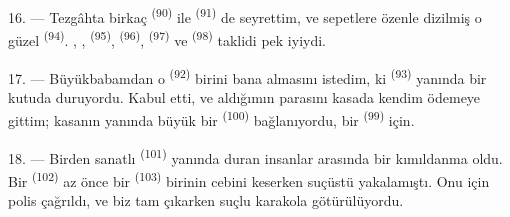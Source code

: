 16. --- Tezgâhta birkaç  \textsuperscript{(90)} ile
 \textsuperscript{(91)} de seyrettim, ve sepetlere
özenle dizilmiş o güzel  \textsuperscript{(94)}.
, , 
\textsuperscript{(95)},  \textsuperscript{(96)},
 \textsuperscript{(97)} ve 
\textsuperscript{(98)} taklidi pek iyiydi.

\VUsaut{4.4mm}
\VUsaut{2.8mm}

17. --- Büyükbabamdan o  \textsuperscript{(92)}
birini bana almasını istedim, ki 
\textsuperscript{(93)} yanında bir kutuda duruyordu. Kabul etti, ve aldığımın parasını kasada kendim ödemeye
gittim; kasanın yanında büyük bir  \textsuperscript{(100)}
bağlanıyordu, bir  \textsuperscript{(99)} için.

18. --- Birden sanatlı  \textsuperscript{(101)}
yanında duran insanlar arasında bir kımıldanma oldu. Bir 
\textsuperscript{(102)} az önce bir 
\textsuperscript{(103)} birinin cebini keserken suçüstü yakalamıştı. Onu
 için polis çağrıldı, ve biz tam çıkarken suçlu karakola
götürülüyordu.
\VUsaut{6.0mm}
\VUfilet{22mm}
